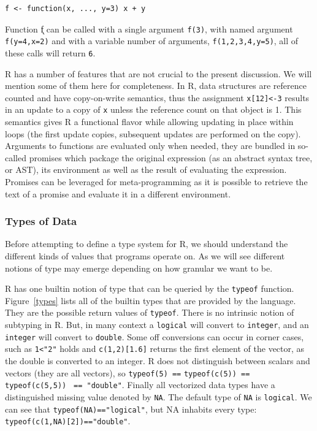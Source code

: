 \documentclass[acmsmall,review,anonymous]{acmart}\settopmatter{printfolios=true,printccs=false,printacmref=false}
\newcommand{\code}[1]{{\lstinline[style=Rin]!#1!}\xspace}
\begin{document}
\begin{lstlisting}
f <- function(x, ..., y=3) x + y
\end{lstlisting}

\noindent
Function \k{f} can be called with a single argument \code{f(3)}, with named
argument \code{f(y=4,x=2)} and with a variable number of arguments,
\code{f(1,2,3,4,y=5)}, all of these calls will return \code{6}.

R has a number of features that are not crucial to the present
discussion. We will mention some of them here for completeness.  In R, data
structures are reference counted and have copy-on-write semantics, thus the
assignment \code{x[12]<-3} results in an update to a copy of \code{x} unless
the reference count on that object is 1.  This semantics gives R a
functional flavor while allowing updating in place within loops (the first
update copies, subsequent updates are performed on the copy). Arguments to
functions are evaluated only when needed, they are bundled in so-called
promises which package the original expression (as an abstract syntax tree, or AST), its environment
as well as the result of evaluating the expression. Promises can be
leveraged for meta-programming as it is possible to retrieve the text of a
promise and evaluate it in a different environment.


\subsubsection{Types of Data}
\label{subsubsec:backgroundtypes}

Before attempting to define a type system for R, we should understand the
different kinds of values that programs operate on.  As we will see
different notions of type may emerge depending on how granular we want to
be.

\renewcommand{\k}[1]{{\tt #1}\xspace}

R has one builtin notion of type that can be queried by the \k{typeof}
function. Figure~\ref{types} lists all of the builtin types that are
provided by the language. They are the possible return values of
\k{typeof}. There is no intrinsic notion of subtyping in R. But, in many
context a \k{logical} will convert to \k{integer}, and an \k{integer} will
convert to \k{double}.  Some off conversions can occur in corner cases, such
as \k{1<"2"} holds and \k{c(1,2)[1.6]} returns the first element of the
vector, as the double is converted to an integer. R does not distinguish
between scalars and vectors (they are all vectors), so \code{typeof(5) ==}
\code{typeof(c(5)) == typeof(c(5,5))} \code{ == "double"}. Finally all
vectorized data types have a distinguished missing value denoted by
\code{NA}. The default type of \code{NA} is \k{logical}. We can see that
\code{typeof(NA)=="logical"}, but NA inhabits every type:
\code{typeof(c(1,NA)[2])=="double"}.
\end{document}
